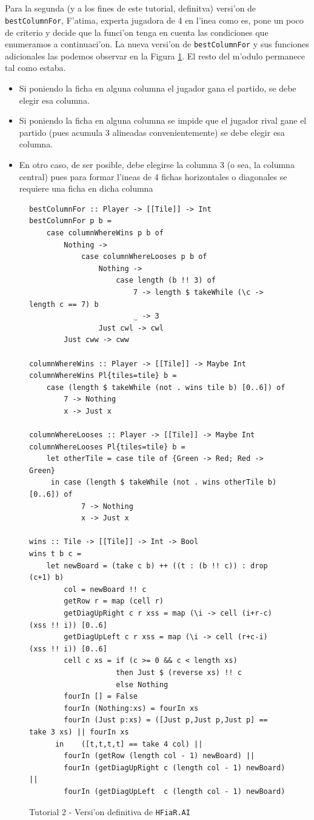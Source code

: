 \documentclass[a4paper]{article}
\begin{document}
\newpage
\subparagraph{}Para la segunda (y a los fines de este tutorial, definitva) versi'on de \texttt{bestColumnFor}, F'atima, experta jugadora de 4 en l'inea como es, pone un poco de criterio y decide que la funci'on tenga en cuenta las condiciones que enumeramos a continuaci'on.  La nueva versi'on de \texttt{bestColumnFor} y sus funciones adicionales las podemos observar en la Figura \ref{tut209}.  El resto del m'odulo permanece tal como estaba.
\begin{itemize}
	\item Si poniendo la ficha en alguna columna el jugador gana el partido, se debe elegir esa columna.
	\item Si poniendo la ficha en alguna columna se impide que el jugador rival gane el partido (pues acumula 3 alineadas convenientemente) se debe elegir esa columna.
	\item En otro caso, de ser posible, debe elegirse la columna 3 (o sea, la columna central) pues para formar l'ineas de 4 fichas horizontales o diagonales se requiere una ficha en dicha columna
\end{itemize}
\begin{figure}[hp]
	\begin{center}
		\begin{lstlisting}
bestColumnFor :: Player -> [[Tile]] -> Int
bestColumnFor p b =
	case columnWhereWins p b of
		Nothing ->
			case columnWhereLooses p b of
				Nothing ->
					case length (b !! 3) of
						7 -> length $ takeWhile (\c -> length c == 7) b
						_ -> 3
				Just cwl -> cwl
		Just cww -> cww

columnWhereWins :: Player -> [[Tile]] -> Maybe Int
columnWhereWins Pl{tiles=tile} b =
	case (length $ takeWhile (not . wins tile b) [0..6]) of
		7 -> Nothing
		x -> Just x

columnWhereLooses :: Player -> [[Tile]] -> Maybe Int
columnWhereLooses Pl{tiles=tile} b =
	let otherTile = case tile of {Green -> Red; Red -> Green}
	 in case (length $ takeWhile (not . wins otherTile b) [0..6]) of
			7 -> Nothing
			x -> Just x

wins :: Tile -> [[Tile]] -> Int -> Bool
wins t b c =
	let	newBoard = (take c b) ++ ((t : (b !! c)) : drop (c+1) b)
		col = newBoard !! c
		getRow r = map (cell r)
		getDiagUpRight c r xss = map (\i -> cell (i+r-c) (xss !! i)) [0..6]
		getDiagUpLeft c r xss = map (\i -> cell (r+c-i) (xss !! i)) [0..6]
		cell c xs = if (c >= 0 && c < length xs)
					then Just $ (reverse xs) !! c
					else Nothing
		fourIn [] = False
		fourIn (Nothing:xs) = fourIn xs
		fourIn (Just p:xs) = ([Just p,Just p,Just p] == take 3 xs) || fourIn xs
      in	([t,t,t,t] == take 4 col) ||
      	fourIn (getRow (length col - 1) newBoard) ||
		fourIn (getDiagUpRight c (length col - 1) newBoard) ||
		fourIn (getDiagUpLeft  c (length col - 1) newBoard)
		\end{lstlisting}
		\caption{Tutorial 2 - Versi'on definitiva de \texttt{HFiaR.AI}}
		\label{tut209}
	\end{center}
\end{figure}
\end{document}
